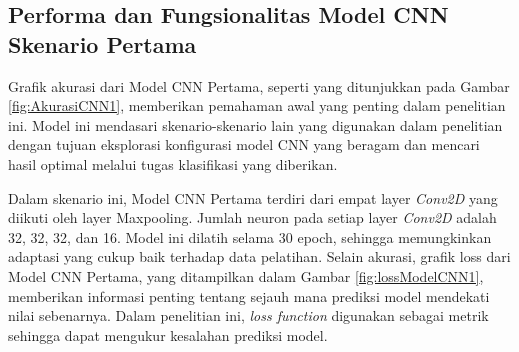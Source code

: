 \subsection*{Performa dan Fungsionalitas Model CNN Skenario Pertama}
Grafik akurasi dari Model CNN Pertama, seperti yang ditunjukkan pada Gambar \ref{fig:AkurasiCNN1}, memberikan pemahaman awal yang penting dalam penelitian ini. Model ini mendasari skenario-skenario lain yang digunakan dalam penelitian dengan tujuan eksplorasi konfigurasi model CNN yang beragam dan mencari hasil optimal melalui tugas klasifikasi yang diberikan.

Dalam skenario ini, Model CNN Pertama terdiri dari empat layer \textit{Conv2D} yang diikuti oleh layer Maxpooling. Jumlah neuron pada setiap layer \textit{Conv2D} adalah 32, 32, 32, dan 16. Model ini dilatih selama 30 epoch, sehingga memungkinkan adaptasi yang cukup baik terhadap data pelatihan. Selain akurasi, grafik loss dari Model CNN Pertama, yang ditampilkan dalam Gambar \ref{fig:lossModelCNN1}, memberikan informasi penting tentang sejauh mana prediksi model mendekati nilai sebenarnya. Dalam penelitian ini, \textit{loss function} digunakan sebagai metrik sehingga dapat mengukur kesalahan prediksi model.

